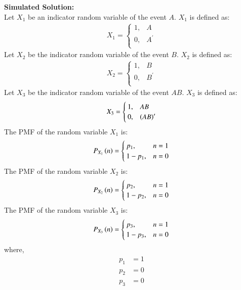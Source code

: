 \documentclass[journal]{IEEEtran}
\begin{document}
\textbf{Simulated Solution:} \\
Let $X_1$ be an indicator random variable of the event $A$. $X_1$ is defined as:
\begin{align}
	X_1 =
	\begin{cases}
		1 ,& A\\
		0 ,& A^\prime\\
	\end{cases}
\end{align}
Let $X_2$ be the indicator random variable of the event $B$. $X_2$ is defined as:
\begin{align}
	X_2 =
	\begin{cases}
		1 ,& B\\
		0 ,& B^\prime\\
	\end{cases}
\end{align}
Let $X_3$ be the indicator random variable of the event $AB$. $X_3$ is defined as:
\begin{align}
	X_3 =
	\begin{cases}
		1 ,& AB\\
		0 ,& \left(AB\right)^\prime\\
	\end{cases}
\end{align}
The PMF of the random variable $X_1$ is:
\begin{align}
	P_{X_1}\left(n\right) = \begin{cases}
		p_1 ,& n = 1 \\
		1 - p_1 ,& n = 0
	\end{cases}
\end{align}
The PMF of the random variable $X_2$ is:
\begin{align}
	P_{X_2}\left(n\right) = \begin{cases}
		p_2 ,& n = 1 \\
		1 - p_2 ,& n = 0
	\end{cases}
\end{align}
The PMF of the random variable $X_3$ is:
\begin{align}
	P_{X_3}\left(n\right) = \begin{cases}
		p_3 ,& n = 1 \\
		1 - p_3 ,& n = 0
	\end{cases}
\end{align}
where,
\begin{align}
	p_1 &= 1\\
	p_2 &= 0\\
	p_3 &= 0\\
\end{align}
\end{document}
